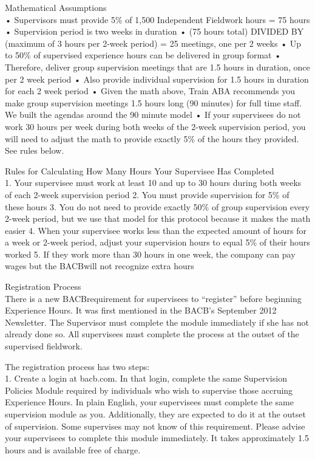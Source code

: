 Mathematical Assumptions\\
    • Supervisors must provide 5\% of 1,500 Independent Fieldwork hours = 75 hours
    • Supervision period is two weeks in duration
    • (75 hours total) DIVIDED BY (maximum of 3 hours per 2-week period) = 25 meetings, one per 2 weeks
    • Up to 50\% of supervised experience hours can be delivered in group format
    • Therefore, deliver group supervision meetings that are 1.5 hours in duration, once per 2 week period
    • Also provide individual supervision for 1.5 hours in duration for each 2 week period
    • Given the math above, Train ABA recommends you make group supervision meetings 1.5 hours long (90 minutes) for full time staff. We built the agendas around the 90 minute model
    • If your supervisees do not work 30 hours per week during both weeks of the 2-week supervision period, you will need to adjust the math to provide exactly 5\% of the hours they provided. See rules below.
    
Rules for Calculating How Many Hours Your Supervisee Has Completed\\
    1. Your supervisee must work at least 10 and up to 30 hours during both weeks of each 2-week supervision period
    2. You must provide supervision for 5\% of these hours
    3. You do not need to provide exactly 50\% of group supervision every 2-week period, but we use that model for this protocol because it makes the math easier
    4. When your supervisee works less than the expected amount of hours for a week or 2-week period, adjust your supervision hours to equal 5\% of their hours worked
    5. If they work more than 30 hours in one week, the company can pay wages but the BACB\textregistered will not recognize extra hours

Registration Process\\
There is a new BACB\textregistered requirement for supervisees to ``register'' before beginning Experience Hours. It was first mentioned in the BACB\textregistered's September 2012 Newsletter. The Supervisor must complete the module immediately if she has not already done so. All supervisees must complete the process at the outset of the supervised fieldwork.

The registration process has two steps:\\
    1. Create a login at bacb.com. In that login, complete the same Supervision Policies Module required by individuals who wish to supervise those accruing Experience Hours. In plain English, your supervisees must complete the same supervision module as you. Additionally, they are expected to do it at the outset of supervision. Some supervises may not know of this requirement. Please advise your supervisees to complete this module immediately. It takes approximately 1.5 hours and is available free of charge.

